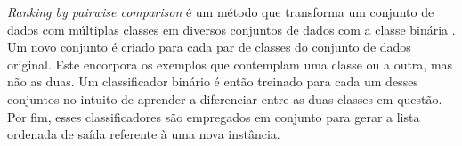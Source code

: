 \textit{Ranking by pairwise comparison} é um método que transforma um conjunto de dados com múltiplas classes em diversos conjuntos de dados com a classe binária \cite{Hullermeier, Mencia, Furnkranz}.
Um novo conjunto é criado para cada par de classes do conjunto de dados original.
Este encorpora os exemplos que contemplam uma classe ou a outra, mas não as duas.
Um classificador binário é então treinado para cada um desses conjuntos no intuito de aprender a diferenciar entre as duas classes em questão.
Por fim, esses classificadores são empregados em conjunto para gerar a lista ordenada de saída referente à uma nova instância.


